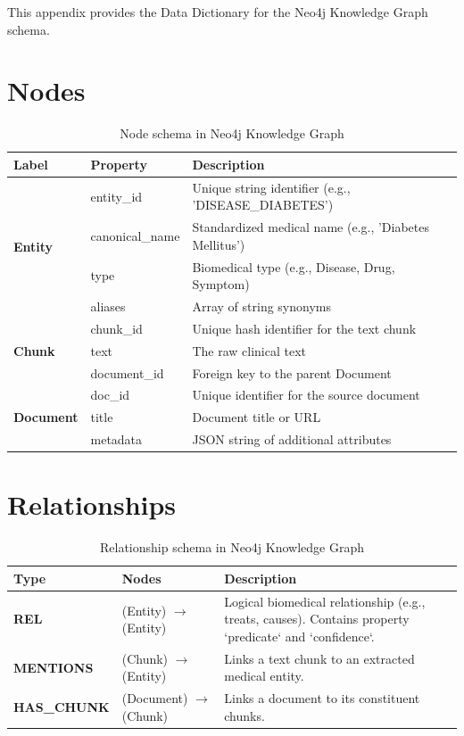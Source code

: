 \documentclass[../main.tex]{subfiles}
\begin{document}
This appendix provides the Data Dictionary for the Neo4j Knowledge Graph schema.

\section*{Nodes}
\begin{table}[H]
\centering
\begin{tabular}{|l|l|p{8cm}|}
\hline
\textbf{Label} & \textbf{Property} & \textbf{Description} \\ \hline
\multirow{4}{*}{\textbf{Entity}} & entity\_id & Unique string identifier (e.g., 'DISEASE\_DIABETES') \\ \cline{2-3} 
 & canonical\_name & Standardized medical name (e.g., 'Diabetes Mellitus') \\ \cline{2-3} 
 & type & Biomedical type (e.g., Disease, Drug, Symptom) \\ \cline{2-3} 
 & aliases & Array of string synonyms \\ \hline
\multirow{3}{*}{\textbf{Chunk}} & chunk\_id & Unique hash identifier for the text chunk \\ \cline{2-3} 
 & text & The raw clinical text \\ \cline{2-3} 
 & document\_id & Foreign key to the parent Document \\ \hline
\multirow{3}{*}{\textbf{Document}} & doc\_id & Unique identifier for the source document \\ \cline{2-3} 
 & title & Document title or URL \\ \cline{2-3} 
 & metadata & JSON string of additional attributes \\ \hline
\end{tabular}
\caption{Node schema in Neo4j Knowledge Graph}
\end{table}

\section*{Relationships}
\begin{table}[H]
\centering
\begin{tabular}{|l|p{4cm}|p{7cm}|}
\hline
\textbf{Type} & \textbf{Nodes} & \textbf{Description} \\ \hline
\textbf{REL} & (Entity) $\rightarrow$ (Entity) & Logical biomedical relationship (e.g., treats, causes). Contains property `predicate` and `confidence`. \\ \hline
\textbf{MENTIONS} & (Chunk) $\rightarrow$ (Entity) & Links a text chunk to an extracted medical entity. \\ \hline
\textbf{HAS\_CHUNK} & (Document) $\rightarrow$ (Chunk) & Links a document to its constituent chunks. \\ \hline
\end{tabular}
\caption{Relationship schema in Neo4j Knowledge Graph}
\end{table}
\end{document}
